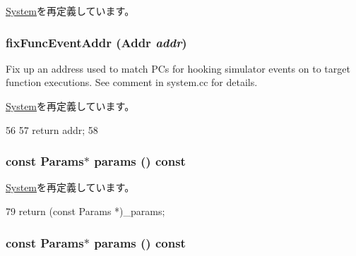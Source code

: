 \hyperlink{classSystem_aff94f650c5eef23b8dc350ea755bdef4}{System}を再定義しています。\hypertarget{classMipsSystem_ac72b76fe05499c31c7091ec5a56c0d52}{
\subsubsection[{fixFuncEventAddr}]{ fixFuncEventAddr ({\bf Addr} {\em addr})}}
\label{classMipsSystem_ac72b76fe05499c31c7091ec5a56c0d52}
Fix up an address used to match PCs for hooking simulator events on to target function executions. See comment in system.cc for details. 

\hyperlink{classSystem_aff94f650c5eef23b8dc350ea755bdef4}{System}を再定義しています。


\begin{DoxyCode}
56 {
57     return addr;
58 }
\end{DoxyCode}
\hypertarget{classMipsSystem_acd3c3feb78ae7a8f88fe0f110a718dff}{
\subsubsection[{params}]{\setlength{\rightskip}{0pt plus 5cm}const {\bf Params}$\ast$ params () const}}
\label{classMipsSystem_acd3c3feb78ae7a8f88fe0f110a718dff}


\hyperlink{classSystem_acd3c3feb78ae7a8f88fe0f110a718dff}{System}を再定義しています。


\begin{DoxyCode}
79 { return (const Params *)_params; }
\end{DoxyCode}
\hypertarget{classMipsSystem_acd3c3feb78ae7a8f88fe0f110a718dff}{
\subsubsection[{params}]{\setlength{\rightskip}{0pt plus 5cm}const {\bf Params}$\ast$ params () const}}
\label{classMipsSystem_acd3c3feb78ae7a8f88fe0f110a718dff}


